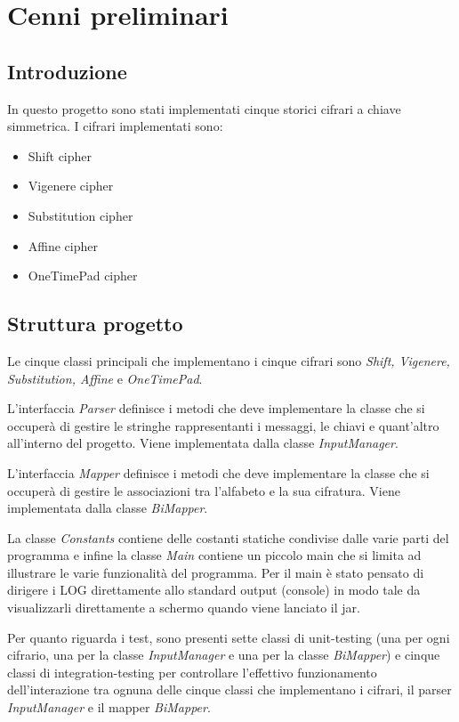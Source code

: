 \chapter{Cenni preliminari}

	\section{Introduzione}
		In questo progetto sono stati implementati cinque storici cifrari a chiave simmetrica. I cifrari implementati sono:
		\begin{itemize}
			\item Shift cipher
			\item Vigenere cipher
			\item Substitution cipher
			\item Affine cipher
			\item OneTimePad cipher
		\end{itemize}
		
	\section{Struttura progetto}
		Le cinque classi principali che implementano i cinque cifrari sono \emph{Shift, Vigenere, Substitution, Affine} e \emph{OneTimePad}.
		
		L'interfaccia \emph{Parser} definisce i metodi che deve implementare la classe che si occuperà di gestire le stringhe rappresentanti i messaggi, le chiavi e quant'altro all'interno del progetto. Viene implementata dalla classe \emph{InputManager}.
		
		L'interfaccia \emph{Mapper} definisce i metodi che deve implementare la classe che si occuperà di gestire le associazioni tra l'alfabeto e la sua cifratura. Viene implementata dalla classe \emph{BiMapper}.
		
		La classe \emph{Constants} contiene delle costanti statiche condivise dalle varie parti del programma e infine la classe \emph{Main} contiene un piccolo main che si limita ad illustrare le varie funzionalità del programma. Per il main è stato pensato di dirigere i LOG direttamente allo standard output (console) in modo tale da visualizzarli direttamente a schermo quando viene lanciato il jar.
		
		Per quanto riguarda i test, sono presenti sette classi di unit-testing (una per ogni cifrario, una per la classe \emph{InputManager} e una per la classe \emph{BiMapper}) e cinque classi di integration-testing per controllare l'effettivo funzionamento dell'interazione tra ognuna delle cinque classi che implementano i cifrari, il parser \emph{InputManager} e il mapper \emph{BiMapper}.